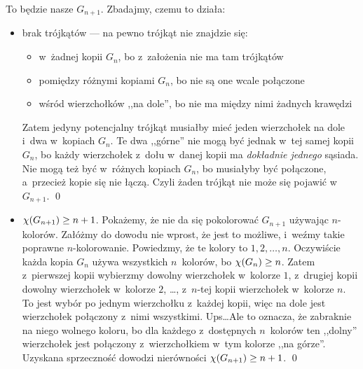 To będzie nasze $G_{n + 1}$. Zbadajmy, czemu to działa:
\begin{itemize}
	\item brak trójkątów --- na pewno trójkąt nie znajdzie się:
	      \begin{itemize}
		      \item w~żadnej kopii $G_n$, bo z~założenia nie ma tam trójkątów
		      \item pomiędzy różnymi kopiami $G_n$, bo nie są one wcale połączone
		      \item wśród wierzchołków ,,na dole'', bo nie ma między nimi żadnych krawędzi
	      \end{itemize}
	      Zatem jedyny potencjalny trójkąt musiałby mieć jeden wierzchołek na dole i~dwa w~kopiach $G_n$. Te dwa ,,górne'' nie mogą być jednak w~tej samej kopii $G_n$, bo każdy wierzchołek z~dołu w~danej kopii ma \emph{dokładnie jednego} sąsiada. Nie mogą też być w~różnych kopiach $G_n$, bo musiałyby być połączone, a~przecież kopie się nie łączą. Czyli żaden trójkąt nie może się pojawić w~$G_{n + 1}$.
	      \qed
	\item $\chi\pars{G_{n + 1}} \geq n + 1$. Pokażemy, że nie da się pokolorować $G_{n + 1}$ używając $n$-kolorów. Załóżmy do dowodu nie wprost, że jest to możliwe, i~weźmy takie poprawne $n$-kolorowanie. Powiedzmy, że te kolory to $1, 2, \ldots, n$. Oczywiście każda kopia $G_n$ używa wszystkich $n$~kolorów, bo $\chi\pars{G_n} \geq n$. Zatem z~pierwszej kopii wybierzmy dowolny wierzchołek w~kolorze $1$, z~drugiej kopii dowolny wierzchołek w~kolorze $2$, \dots, z~$n$-tej kopii wierzchołek w~kolorze $n$. To jest wybór po jednym wierzchołku z~każdej kopii, więc na dole jest wierzchołek połączony z~nimi wszystkimi. Ups\dots Ale to oznacza, że zabraknie na niego wolnego koloru, bo dla każdego z~dostępnych $n$~kolorów ten ,,dolny'' wierzchołek jest połączony z~wierzchołkiem w~tym kolorze ,,na górze''. Uzyskana sprzeczność dowodzi nierówności $\chi\pars{G_{n + 1}} \geq n + 1$.
	      \qed
\end{itemize}
